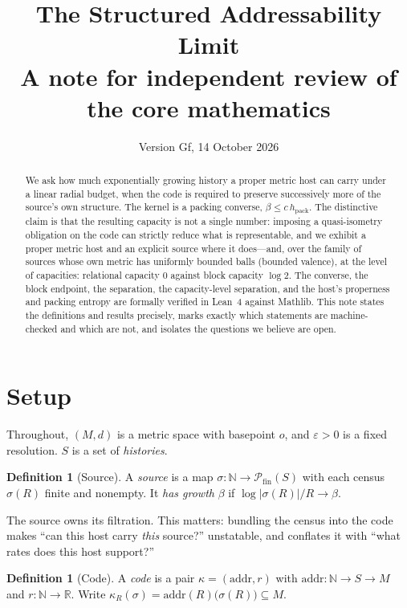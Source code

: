 \documentclass[11pt,a4paper]{article}
\title{The Structured Addressability Limit\\
\large A note for independent review of the core mathematics}
\author{}
\date{Version Gf, 14 October 2026}
\theoremstyle{plain}
\theoremstyle{definition}
\newtheorem{definition}[theorem]{Definition}
\theoremstyle{remark}
\newcommand{\hpack}{h_{\mathrm{pack}}}
\begin{document}
\maketitle

\begin{abstract}
We ask how much exponentially growing history a proper metric host can carry
under a linear radial budget, when the code is required to preserve
successively more of the source's own structure. The kernel is a packing
converse, $\beta \le c\,\hpack$. The distinctive claim is that the resulting
capacity is not a single number: imposing a quasi-isometry obligation on the
code can strictly reduce what is representable, and we exhibit a proper metric
host and an explicit source where it does---and, over the family of sources
whose own metric has uniformly bounded balls (bounded valence), at the level of
capacities: relational capacity $0$ against block capacity $\log 2$. The
converse, the block endpoint, the separation, the capacity-level separation,
and the host's properness and packing entropy are formally verified in Lean~4
against Mathlib. This note
states the definitions and results precisely, marks exactly which statements
are machine-checked and which are not, and isolates the questions we believe
are open.
\end{abstract}

\section{Setup}

Throughout, $(M,d)$ is a metric space with basepoint $o$, and $\varepsilon>0$ is
a fixed resolution. $S$ is a set of \emph{histories}.

\begin{definition}[Source]
A \emph{source} is a map $\sigma:\mathbb{N}\to\mathcal{P}_{\mathrm{fin}}(S)$
with each census $\sigma(R)$ finite and nonempty. It \emph{has growth} $\beta$
if $\log|\sigma(R)|/R \to \beta$.
\end{definition}

The source owns its filtration. This matters: bundling the census into the code
makes ``can this host carry \emph{this} source?'' unstatable, and conflates it
with ``what rates does this host support?''

\begin{definition}[Code]
A \emph{code} is a pair $\kappa=(\mathrm{addr},r)$ with
$\mathrm{addr}:\mathbb{N}\to S\to M$ and $r:\mathbb{N}\to\mathbb{R}$.
Write $\kappa_R(\sigma) = \mathrm{addr}(R)\bigl(\sigma(R)\bigr)\subseteq M$.
\end{definition}
\end{document}
